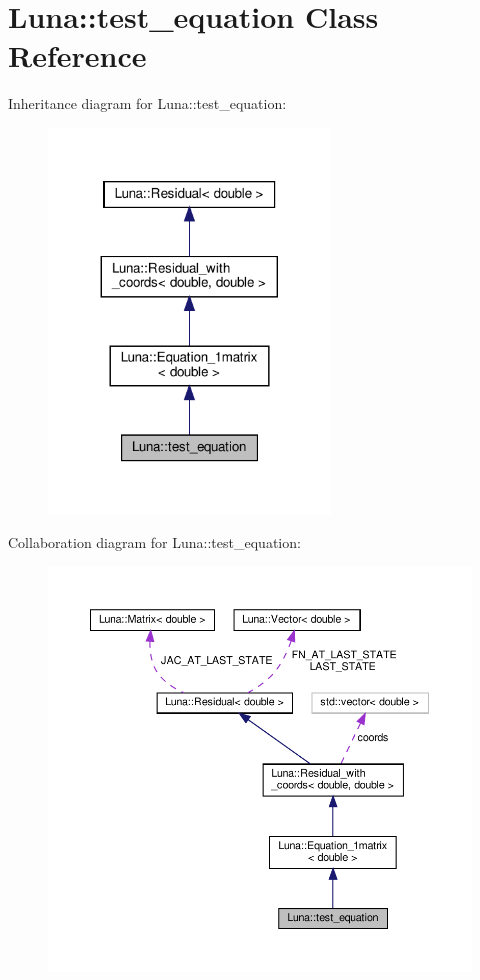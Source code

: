 \hypertarget{classLuna_1_1test__equation}{}\section{Luna\+:\+:test\+\_\+equation Class Reference}
\label{classLuna_1_1test__equation}


Inheritance diagram for Luna\+:\+:test\+\_\+equation\+:\nopagebreak
\begin{figure}[H]
\begin{center}
\leavevmode
\includegraphics[width=212pt]{classLuna_1_1test__equation__inherit__graph}
\end{center}
\end{figure}


Collaboration diagram for Luna\+:\+:test\+\_\+equation\+:\nopagebreak
\begin{figure}[H]
\begin{center}
\leavevmode
\includegraphics[width=350pt]{classLuna_1_1test__equation__coll__graph}
\end{center}
\end{figure}
